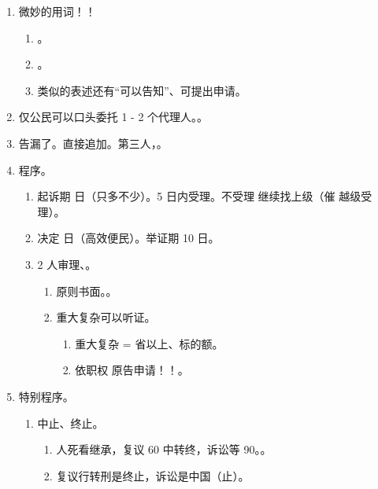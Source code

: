 \begin{enumerate}
\begin{enumerate}
        \end{enumerate}
  \item 微妙的用词！！
        \begin{enumerate}
          \item {}。
          \item {}。
          \item 类似的表述还有“可以告知”、可提出申请。
        \end{enumerate}
  \item 仅公民可以口头委托 1 - 2 个代理人。。
  \item 告漏了。直接追加。第三人，。
  \item 程序。
        \begin{enumerate}
          \item 起诉期  日（只多不少）。5 日内受理。不受理 \yjt 继续找上级（催 \hz 越级受理）。
          \item 决定  日（高效便民）。举证期 10 日。
          \item 2 人审理、。
                \begin{enumerate}
                  \item 原则书面。。
                  \item 重大复杂可以听证。
                        \begin{enumerate}
                          \item 重大复杂 = 省以上、标的额。
                          \item 依职权 \hz 原告申请！！。
                        \end{enumerate}
                \end{enumerate}
        \end{enumerate}
  \item 特别程序。
        \begin{enumerate}
          \item 中止、终止。
                \begin{enumerate}
                  \item 人死看继承，复议 60 中转终，诉讼等 90。。
                  \item 复议行转刑是终止，诉讼是中国（止）。

\end{enumerate}
\end{enumerate}
\end{enumerate}
